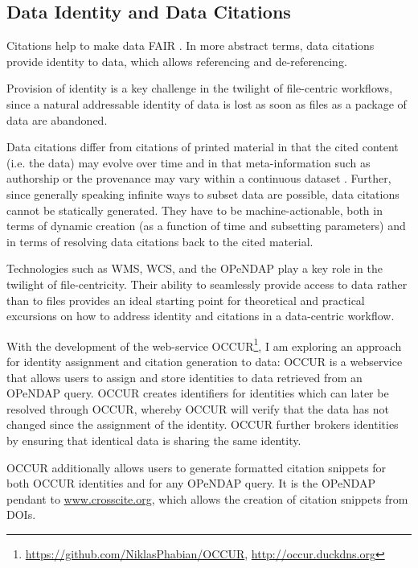 \documentclass[letterpaper, parskip=half]{scrartcl}
\begin{document}
\newpage

\subsection{Data Identity and Data Citations}
Citations help to make data \acrfull{FAIR} \citep{Wilkinson2016}. In more abstract terms, data citations provide identity to data, which allows referencing and de-referencing.

Provision of identity is a key challenge in the twilight of file-centric workflows, since a natural addressable identity of data is lost as soon as files as a package of data are abandoned.

Data citations differ from citations of printed material in that the cited content (i.e. the data) may evolve over time and in that meta-information such as authorship or the provenance may vary within a continuous dataset \citep{Buneman2016}. Further, since generally speaking infinite ways to subset data are possible, data citations cannot be statically generated. They have to be machine-actionable, both in terms of dynamic creation (as a function of time and subsetting parameters) and in terms of resolving data citations back to the cited material.

Technologies such as \gls{WMS}, \gls{WCS}, and the \gls{OPeNDAP} \citep{Gallagher2005} play a key role in the twilight of file-centricity. Their ability to seamlessly provide access to data rather than to files provides an ideal starting point for theoretical and practical excursions on how to address identity and citations in a data-centric workflow. 


With the development of the web-service \gls{OCCUR}\footnote{\url{https://github.com/NiklasPhabian/OCCUR}, \url{http://occur.duckdns.org}}, I am exploring an approach for identity assignment and citation generation to data:
\Gls{OCCUR} is a webservice that allows users to assign and store identities to data retrieved from an \gls{OPeNDAP} query. 
OCCUR creates identifiers for identities which can later be resolved through \gls{OCCUR}, whereby \gls{OCCUR} will verify that the data has not changed since the assignment of the identity. OCCUR further brokers identities by ensuring that identical data is sharing the same identity.

\gls{OCCUR} additionally allows users to generate formatted citation snippets for both OCCUR identities and for any \gls{OPeNDAP} query. It is the \gls{OPeNDAP} pendant to \url{www.crosscite.org}, which allows the creation of citation snippets from \glspl{DOI}. 
\end{document}
